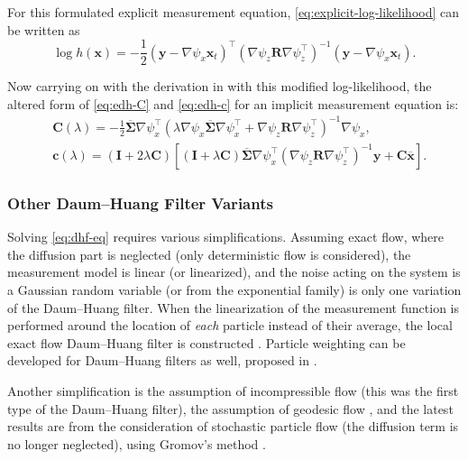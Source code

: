 For this formulated explicit measurement equation, \eqref{eq:explicit-log-likelihood} can be written as
\begin{equation}
    \log h(\mathbf{x}) =-\frac{1}{2}(\mathbf{y}-\nabla \psi_x \mathbf{x}_t)^{\top} (\nabla \psi_z\mathbf{R}\nabla \psi_z^{\top})^{-1}(\mathbf{y}-\nabla \psi_x \mathbf{x}_t).
\end{equation}

Now carrying on with the derivation in \cite{Khan2018} with this modified log-likelihood,
the altered form of \eqref{eq:edh-C} and \eqref{eq:edh-c} for an implicit measurement
equation is:
\begin{align}
     & \mathbf{C}(\lambda) = -\frac{1}{2}\mathbf{\mathbf{\overline\Sigma}}\nabla \psi_x^\top\left(\lambda \nabla \psi_x\mathbf{\overline\Sigma}\nabla \psi_x^\top + \nabla \psi_z\mathbf{R}\nabla \psi_z^{\top}\right)^{-1}\nabla \psi_x,  \label{eq:edh-C-impl}                             \\
     & \mathbf{c}(\lambda) = \left(\mathbf{I}+2\lambda\mathbf{C}\right)\left[\left(\mathbf{I}+\lambda\mathbf{C}\right)\mathbf{\overline\Sigma}\nabla \psi_x^\top(\nabla \psi_z\mathbf{R}\nabla \psi_z^{\top})^{-1}\mathbf{y} + \mathbf{C}\overline{\mathbf{x}}\right]. \label{eq:edh-c-impl}
\end{align}
\subsubsection{Other Daum--Huang Filter Variants}

Solving \eqref{eq:dhf-eq} requires various simplifications. Assuming exact flow, where the diffusion part is neglected (only deterministic flow is considered), the measurement model is linear (or linearized), and the noise acting on the system is a Gaussian random variable (or from the exponential family) is only one variation of the Daum--Huang filter. When the linearization of the measurement function is performed around the location of \emph{each} particle instead of their average, the local exact flow Daum--Huang filter is constructed \cite{Ding2012}. Particle weighting can be developed for Daum--Huang filters as well, proposed in \cite{Li2016}.

Another simplification is the assumption of incompressible flow \cite{Daum2007}  (this was the first type of the Daum--Huang filter), the assumption of geodesic flow \cite{Daum2013}, and the latest results are from the consideration of stochastic particle flow (the diffusion term is no longer neglected), using Gromov's method \cite{Daum2018,Dai2021}.

